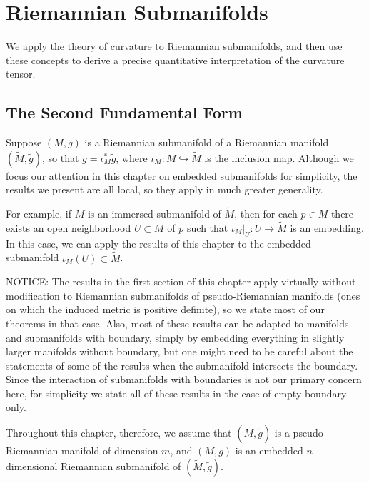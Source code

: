 \documentclass[../main.tex]{subfiles}
\begin{document}
\chapter{Riemannian Submanifolds}

We apply the theory of curvature to Riemannian submanifolds, and then use these concepts to derive a precise quantitative interpretation of the curvature tensor.

\section{The Second Fundamental Form}
Suppose $(M,g)$ is a Riemannian submanifold of a Riemannian manifold $(\tilde{M},\tilde{g})$, so that $g = \iota_M^*\tilde{g}$, where $\iota_M:M\hookrightarrow \tilde{M}$ is the inclusion map. Although we focus our attention in this chapter on embedded submanifolds for simplicity, the results we present are all local, so they apply in much greater generality.

\begin{remark}
	For example, if $M$ is an immersed submanifold of $\tilde{M}$, then for each $p\in M$ there exists an open neighborhood $U\subset M$ of $p$ such that $\iota_M|_U:U\to \tilde{M}$ is an embedding. In this case, we can apply the results of this chapter to the embedded submanifold $\iota_M(U)\subset \tilde{M}$.
\end{remark}

NOTICE: The results in the first section of this chapter apply virtually without modification to Riemannian submanifolds of pseudo-Riemannian manifolds (ones on which the induced metric is positive definite), so we state most of our theorems in that case. Also, most of these results can be adapted to manifolds and submanifolds with boundary, simply by embedding everything in slightly larger manifolds without boundary, but one might need to be careful about the statements of some of the results when the submanifold intersects the boundary. Since the interaction of submanifolds with boundaries is not our primary concern here, for simplicity we state all of these results in the case of empty boundary only.

Throughout this chapter, therefore, we assume that $(\tilde{M},\tilde{g})$ is a pseudo-Riemannian manifold of dimension $m$, and $(M,g)$ is an embedded $n$-dimensional Riemannian submanifold of $(\tilde{M},\tilde{g})$.
\end{document}
